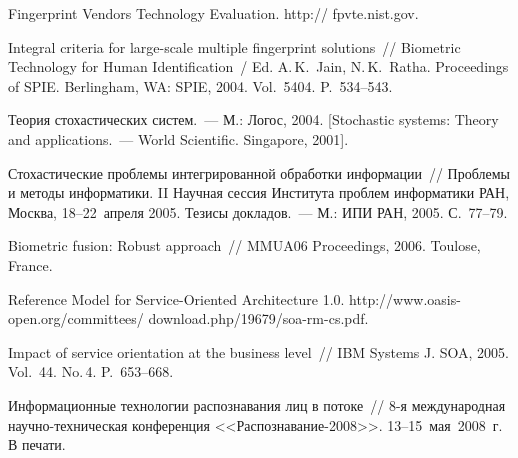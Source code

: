 \begin{multicols}{2}
{{\begin{thebibliography}{99}
Fingerprint Vendors Technology Evaluation.  {\sf  http:// fpvte.nist.gov}.


Integral criteria for large-scale multiple fingerprint solutions~// Biometric 
Technology for Human Identification~/ Ed. A.\,K.~Jain, N.\,K.~Ratha. 
Proceedings of SPIE. Berlingham, WA: SPIE, 2004. Vol.~5404. P.~534--543.

Теория стохастических систем.~--- М.: Логос, 2004. [Stochastic systems: 
Theory and applications.~--- World Scientific. Singapore, 2001].

Стохастические проблемы интегрированной обработки информации~// 
Проблемы и методы информатики. II Научная сессия Института проблем 
информатики РАН, Москва, 18--22~апреля 2005. Тезисы докладов.~--- М.: 
ИПИ РАН, 2005. С.~77--79.

Biometric fusion: Robust approach~// MMUA06 Proceedings, 2006. Toulose, 
France.


Reference Model for Service-Oriented Architecture 1.0.
{\sf http://www.oasis-open.org/committees/ \mbox{download.php/19679/soa-rm-cs.pdf}}.

 Impact of service orientation at the business level~// IBM Systems J. SOA, 
2005. Vol.~44. No.\,4. P.~653--668.

\label{end\stat}

Информационные технологии распознавания лиц в потоке~// 8-я 
международная научно-техническая конференция 
<<Распознавание-2008>>. 13--15~мая~2008~г. В печати.

\end{thebibliography}

}
}
\end{multicols}



%
%


 
 
 
 